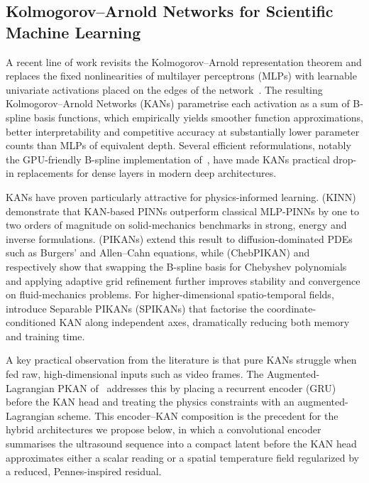 \documentclass[conference]{IEEEtran}
\begin{document}
\subsection{Kolmogorov--Arnold Networks for Scientific Machine Learning}
A recent line of work revisits the Kolmogorov--Arnold representation theorem and replaces the fixed nonlinearities of multilayer perceptrons (MLPs) with learnable univariate activations placed on the edges of the network~\cite{liu2024kan}. 
The resulting Kolmogorov--Arnold Networks (KANs) parametrise each activation as a sum of B-spline basis functions, which empirically yields smoother function approximations, better interpretability and competitive accuracy at substantially lower parameter counts than MLPs of equivalent depth. 
Several efficient reformulations, notably the GPU-friendly B-spline implementation of~\cite{blealtan2024efficientkan}, have made KANs practical drop-in replacements for dense layers in modern deep architectures.

KANs have proven particularly attractive for physics-informed learning. \cite{wang2024kinn}
 (KINN) demonstrate that KAN-based PINNs outperform classical MLP-PINNs by one to two orders of magnitude on solid-mechanics benchmarks in strong, energy and inverse formulations. \cite{patra2024pikan} 
 (PIKANs) extend this result to diffusion-dominated PDEs such as Burgers' and Allen--Cahn equations, while \cite{guo2025chebpikan} (ChebPIKAN) and~\cite{rigas2024adaptivepikan} respectively show that swapping the B-spline basis for Chebyshev polynomials and applying adaptive grid refinement further improves stability and convergence on fluid-mechanics problems. 
 For higher-dimensional spatio-temporal fields, \cite{jacob2025spikan} introduce Separable PIKANs (SPIKANs) that factorise the coordinate-conditioned KAN along independent axes, dramatically reducing both memory and training time.

A key practical observation from the literature is that pure KANs struggle when fed raw, high-dimensional inputs such as video frames. 
The Augmented-Lagrangian PKAN of~\cite{shen2025alpkan} addresses this by placing a recurrent encoder (GRU) before the KAN head and treating the physics constraints with an augmented-Lagrangian scheme. 
This encoder--KAN composition is the precedent for the hybrid architectures we propose below, in which a convolutional encoder summarises the ultrasound sequence into a compact latent before the KAN head approximates either a scalar reading or a spatial temperature field regularized by a reduced, Pennes-inspired residual.
\end{document}
